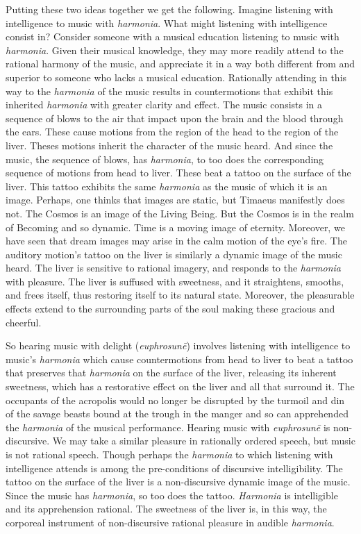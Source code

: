 Putting these two ideas together we get the following. Imagine listening with intelligence to music with \emph{harmonia}. What might listening with intelligence consist in? Consider someone with a musical education listening to music with \emph{harmonia}. Given their musical knowledge, they may more readily attend to the rational harmony of the music, and appreciate it in a way both different from and superior to someone who lacks a musical education. Rationally attending in this way to the \emph{harmonia} of the music results in countermotions that exhibit this inherited \emph{harmonia} with greater clarity and effect. The music consists in a sequence of blows to the air that impact upon the brain and the blood through the ears. These cause motions from the region of the head to the region of the liver. Theses motions inherit the character of the music heard. And since the music, the sequence of blows, has \emph{harmonia}, to too does the corresponding sequence of motions from head to liver. These beat a tattoo on the surface of the liver. This tattoo exhibits the same \emph{harmonia} as the music of which it is an image. Perhaps, one thinks that images are static, but Timaeus manifestly does not. The Cosmos is an image of the Living Being. But the Cosmos is in the realm of Becoming and so dynamic. Time is a moving image of eternity. Moreover, we have seen that dream images may arise in the calm motion of the eye's fire. The auditory motion's tattoo on the liver is similarly a dynamic image of the music heard. The liver is sensitive to rational imagery, and responds to the \emph{harmonia} with pleasure. The liver is suffused with sweetness, and it straightens, smooths, and frees itself, thus restoring itself to its natural state. Moreover, the pleasurable effects extend to the surrounding parts of the soul making these gracious and cheerful.

So hearing music with delight (\emph{euphrosunē}) involves listening with intelligence to music's \emph{harmonia} which cause countermotions from head to liver to beat a tattoo that preserves that \emph{harmonia} on the surface of the liver, releasing its inherent sweetness, which has a restorative effect on the liver and all that surround it. The occupants of the acropolis would no longer be disrupted by the turmoil and din of the savage beasts bound at the trough in the manger and so can apprehended the \emph{harmonia} of the musical performance. Hearing music with \emph{euphrosunē} is non-discursive. We may take a similar pleasure in rationally ordered speech, but music is not rational speech. Though perhaps the \emph{harmonia} to which listening with intelligence attends is among the pre-conditions of discursive intelligibility. The tattoo on the surface of the liver is a non-discursive dynamic image of the music. Since the music has \emph{harmonia}, so too does the tattoo. \emph{Harmonia} is intelligible and its apprehension rational. The sweetness of the liver is, in this way, the corporeal instrument of non-discursive rational pleasure in audible \emph{harmonia}.


